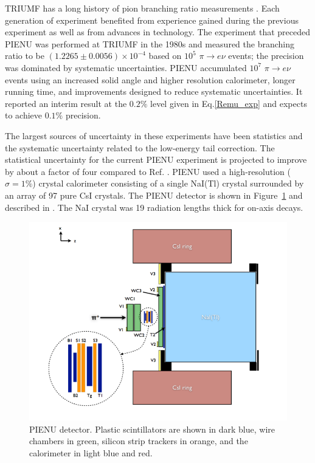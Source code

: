 TRIUMF has a long history of pion branching ratio measurements \cite{Bryman3, Britton}. Each generation of experiment benefited from experience gained during the previous experiment as well as from advances in technology. The experiment that preceded PIENU was performed at TRIUMF in the 1980s and measured the branching ratio to be $(1.2265 \pm 0.0056) \times 10^{-4}$ based on $10^5$ $\pi \to e \nu$ events; the precision was dominated by systematic uncertainties.  PIENU \cite{Aguilar-Arevalo1, Aguilar-Arevalo2, Aguilar-Arevalo4, Aguilar-Arevalo5} accumulated $10^7$ $\pi \to e \nu$ events using an increased solid angle and higher resolution calorimeter, longer running time, and improvements designed to reduce systematic uncertainties. It  reported an interim result at the $0.2\%$ level given in Eq.\ref{Remu_exp} and expects to achieve $0.1\%$ precision.

The largest sources of uncertainty in these experiments have been statistics and the systematic uncertainty related to the low-energy tail correction. The statistical uncertainty for the current PIENU experiment is projected to improve by about a factor of four compared to Ref. \cite{Britton}. 
PIENU used a high-resolution ($\sigma=1\%$) crystal calorimeter consisting of a single NaI(Tl) crystal surrounded by an array of 97 pure CsI crystals. The PIENU detector is shown in Figure~\ref{fig:detector_PIENU} and described in \cite{Aguilar-Arevalo4}. The NaI crystal was 19 radiation lengths thick for on-axis decays.

\begin{figure}[h!]
\centering
\includegraphics[scale=0.45]{sections/figures/PIENUDetector.png}
\caption{PIENU detector. Plastic scintillators are shown in dark blue, wire chambers in green, silicon strip trackers in orange, and the calorimeter in light blue and red.}
\label{fig:detector_PIENU}
\end{figure}

